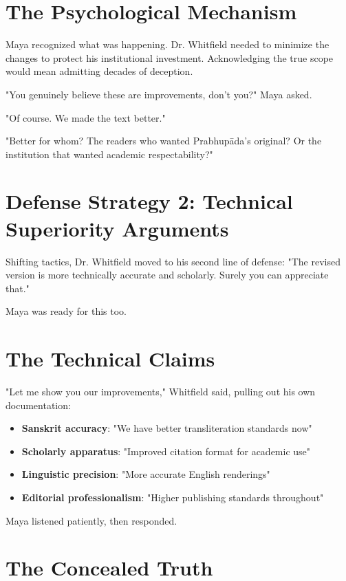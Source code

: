 \documentclass[11pt,twoside]{book}
\begin{document}
\section*{The Psychological Mechanism}
\label{sec:org2665ac1}

Maya recognized what was happening. Dr. Whitfield needed to minimize the changes to protect his institutional investment. Acknowledging the true scope would mean admitting decades of deception.

"You genuinely believe these are improvements, don't you?" Maya asked.

"Of course. We made the text better."

"Better for whom? The readers who wanted Prabhupāda's original? Or the institution that wanted academic respectability?"
\section*{Defense Strategy 2: Technical Superiority Arguments}
\label{sec:org3880659}

Shifting tactics, Dr. Whitfield moved to his second line of defense: "The revised version is more technically accurate and scholarly. Surely you can appreciate that."

Maya was ready for this too.
\section*{The Technical Claims}
\label{sec:orge043964}

"Let me show you our improvements," Whitfield said, pulling out his own documentation:

\begin{itemize}
\item \textbf{\textbf{Sanskrit accuracy}}: "We have better transliteration standards now"
\item \textbf{\textbf{Scholarly apparatus}}: "Improved citation format for academic use"
\item \textbf{\textbf{Linguistic precision}}: "More accurate English renderings"
\item \textbf{\textbf{Editorial professionalism}}: "Higher publishing standards throughout"
\end{itemize}

Maya listened patiently, then responded.
\section*{The Concealed Truth}
\label{sec:orgc528a56}
\end{document}
